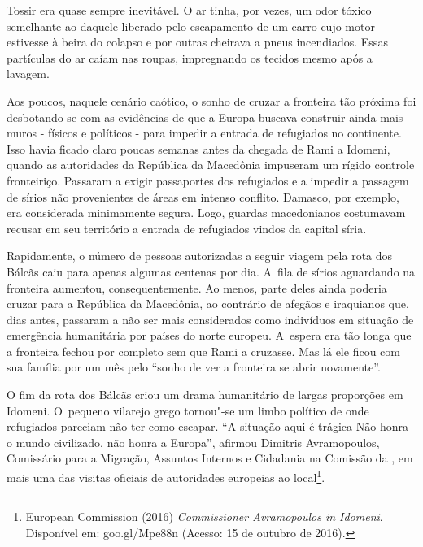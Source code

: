 Tossir era quase sempre inevitável. O ar tinha, por vezes, um odor tóxico semelhante ao daquele liberado
pelo escapamento de um carro cujo motor estivesse à beira do colapso e por outras cheirava a pneus incendiados. 
Essas partículas do ar caíam nas roupas, impregnando os tecidos mesmo após a lavagem.
% 
% 
% 
%
%

% 
% 
Aos poucos, naquele cenário caótico, o  sonho de cruzar a fronteira tão
próxima foi desbotando-se com as evidências de que a Europa buscava
construir ainda mais muros - físicos e políticos - para impedir a entrada
de refugiados no continente. Isso havia ficado claro poucas semanas
antes da chegada de Rami a Idomeni, quando as autoridades da República
da Macedônia impuseram um rígido controle fronteiriço. Passaram a exigir
passaportes dos refugiados e a impedir a passagem de sírios não
provenientes de áreas em intenso conflito. Damasco, por exemplo, era
considerada minimamente segura. Logo, guardas macedonianos costumavam
recusar em seu território a entrada de refugiados vindos da capital
síria.

Rapidamente, o número de pessoas autorizadas a seguir viagem pela rota
dos Bálcãs caiu para apenas algumas centenas por dia. A~fila de sírios
aguardando na fronteira aumentou, consequentemente. Ao menos, parte
deles ainda poderia cruzar para a República da Macedônia, ao contrário
de afegãos e iraquianos que, dias antes, passaram a não ser mais
considerados como indivíduos em situação de emergência humanitária por
países do norte europeu. A~espera era tão longa que a fronteira fechou
por completo sem que Rami a cruzasse. Mas lá ele ficou com sua família
por um mês pelo ``sonho de ver a fronteira se abrir novamente''.

O fim da rota dos Bálcãs criou um drama humanitário de largas proporções
em Idomeni. O~pequeno vilarejo grego tornou"-se um limbo político de onde
refugiados pareciam não ter como escapar. ``A situação aqui é trágica
\redondo{[…]} Não honra o mundo civilizado, não honra a Europa'',
afirmou Dimitris Avramopoulos, Comissário para a Migração, Assuntos
Internos e Cidadania na Comissão da , em mais uma das visitas oficiais
de autoridades europeias ao local\footnote{ European Commission (2016) \emph{Commissioner
Avramopoulos in Idomeni}. Disponível em:
goo.gl/Mpe88n (Acesso: 15
de outubro de 2016).}.

